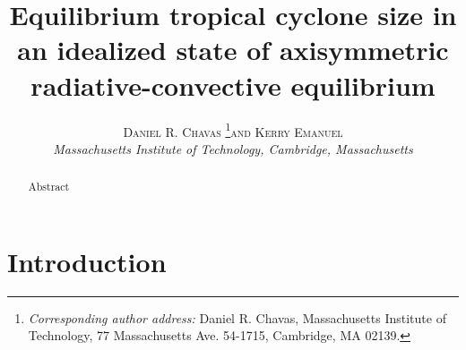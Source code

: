 \documentclass[12pt]{article}
\newcommand{\myabstract}{Abstract}
\begin{document}
%
%
\title{\textbf{\large{Equilibrium tropical cyclone size in an idealized state of axisymmetric radiative-convective equilibrium}}}
%
%
\author{\textsc{Daniel R. Chavas}
				\thanks{\textit{Corresponding author address:} 
				Daniel R. Chavas, Massachusetts Institute of Technology, 
				77 Massachusetts Ave. 54-1715, Cambridge, MA 02139. 
				}\quad\textsc{and Kerry Emanuel}\\
\textit{\footnotesize{Massachusetts Institute of Technology, Cambridge, Massachusetts}}
}
%
{
\twocolumn[
\begin{@twocolumnfalse}
\amstitle

\begin{center}
\begin{minipage}{13.0cm}
\begin{abstract}
	\myabstract
	\newline
	\begin{center}
		\rule{38mm}{0.2mm}
	\end{center}
\end{abstract}
\end{minipage}
\end{center}
\end{@twocolumnfalse}
]
}
{
\amstitle
\begin{abstract}
\myabstract
\end{abstract}
\newpage
}

\section{Introduction}
\end{document}
